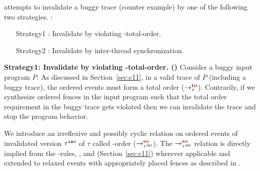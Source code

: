 \ourtechnique attempts to invalidate a buggy trace (\aka counter
example) by one of the following two strategies. :
\begin{itemize}[label=strategy1,align=left,leftmargin=*]
	\item [Strategy1]:
		Invalidate by violating \sc-total-order.
	\item [Strategy2]:
		Invalidate by inter-thread synchronization.
\end{itemize}

\noindent
{\bf Strategy1: Invalidate by violating \sc-total-order. 
	(\sfence)}\newline
Consider a buggy input program $P$.
%
As discussed in Section~\ref{sec:c11}, in a valid trace of $P$ 
(including a buggy trace), 
the \sc ordered events must form a total order ($\setTO$).
%
Contrarily, if we synthesize \sc ordered fences in the input program 
such that the total order requirement in the buggy trace gets violated 
then we can invalidate the trace and stop the program behavior.

We introduce an irreflexive and possibly cyclic relation
on \sc ordered events of invalidated version ${\tau}^{\mathtt{inv}}$ of $\tau$ 
called \sc-order ($\setSO$).
%
The $\setSO$ relation is directly implied from
the \lto-rules, ,   
and  (Section~\ref{sec:c11}) wherever applicable
%
and extended to relaxed events with appropriately placed fences 
as described in \cc \cite{C11}\cite{Batty-POPL12}.


